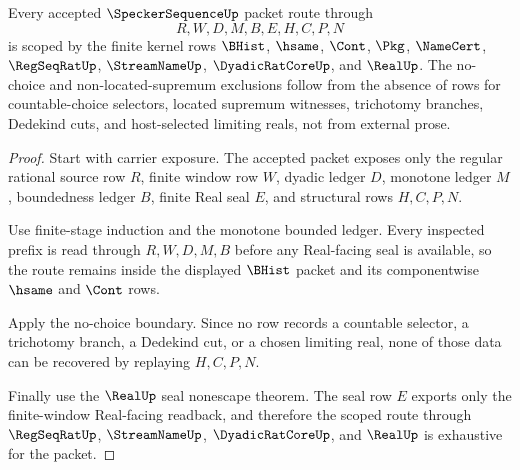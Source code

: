 \begin{theorem}
\label{thm:speckersequence-scoped-kernel-route}
Every accepted $\SpeckerSequenceUp$ packet route through
$$
R,W,D,M,B,E,H,C,P,N
$$
is scoped by the finite kernel rows $\BHist$, $\hsame$, $\Cont$, $\Pkg$, $\NameCert$, $\RegSeqRatUp$, $\StreamNameUp$, $\DyadicRatCoreUp$, and $\RealUp$. The no-choice and non-located-supremum exclusions follow from the absence of rows for countable-choice selectors, located supremum witnesses, trichotomy branches, Dedekind cuts, and host-selected limiting reals, not from external prose.
\end{theorem}
\begin{proof}
Start with carrier exposure. The accepted packet exposes only the regular rational source row $R$, finite window row $W$, dyadic ledger $D$, monotone ledger $M$, boundedness ledger $B$, finite Real seal $E$, and structural rows $H,C,P,N$.

Use finite-stage induction and the monotone bounded ledger. Every inspected prefix is read through $R,W,D,M,B$ before any Real-facing seal is available, so the route remains inside the displayed $\BHist$ packet and its componentwise $\hsame$ and $\Cont$ rows.

Apply the no-choice boundary. Since no row records a countable selector, a trichotomy branch, a Dedekind cut, or a chosen limiting real, none of those data can be recovered by replaying $H,C,P,N$.

Finally use the $\RealUp$ seal nonescape theorem. The seal row $E$ exports only the finite-window Real-facing readback, and therefore the scoped route through $\RegSeqRatUp$, $\StreamNameUp$, $\DyadicRatCoreUp$, and $\RealUp$ is exhaustive for the packet.
\end{proof}

